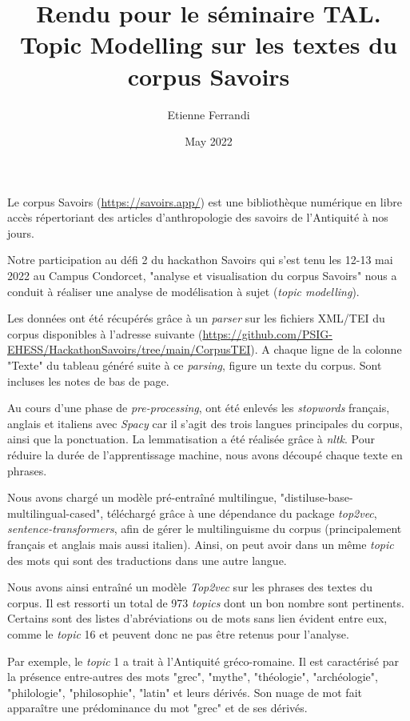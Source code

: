\documentclass{article}
\title{Rendu pour le séminaire TAL. Topic Modelling sur les textes du corpus Savoirs}
\author{Etienne Ferrandi}
\date{May 2022}
\begin{document}
\maketitle

Le corpus Savoirs (\url{https://savoirs.app/}) est une bibliothèque numérique en libre accès répertoriant des articles d'anthropologie des savoirs de l'Antiquité à nos jours. 

Notre participation au défi 2 du hackathon Savoirs qui s'est tenu les 12-13 mai 2022 au Campus Condorcet, "analyse et visualisation du corpus Savoirs" nous a conduit à réaliser une analyse de modélisation à sujet (\textit{topic modelling}). 

Les données ont été récupérés grâce à un \textit{parser} sur les fichiers XML/TEI du corpus disponibles à l'adresse suivante (\url{https://github.com/PSIG-EHESS/HackathonSavoirs/tree/main/CorpusTEI}). A chaque ligne de la colonne "Texte" du tableau généré suite à ce \textit{parsing}, figure un texte du corpus. Sont incluses les notes de bas de page.

Au cours d'une phase de \textit{pre-processing}, ont été enlevés les \textit{stopwords} français, anglais et italiens avec \textit{Spacy} car il s'agit des trois langues principales du corpus, ainsi que la ponctuation. La lemmatisation a été réalisée grâce à \textit{nltk}. Pour réduire la durée de l'apprentissage machine, nous avons découpé chaque texte en phrases. 

Nous avons chargé un modèle pré-entraîné multilingue, "distiluse-base-multilingual-cased", téléchargé grâce à une dépendance du package \textit{top2vec}, \textit{sentence-transformers}, afin de gérer le multilinguisme du corpus (principalement français et anglais mais aussi italien). Ainsi, on peut avoir dans un même \textit{topic} des mots qui sont des traductions dans une autre langue.

Nous avons ainsi entraîné un modèle \textit{Top2vec} sur les phrases des textes du corpus. Il est ressorti un total de 973 \textit{topics} dont un bon nombre sont pertinents. Certains sont des listes d'abréviations ou de mots sans lien évident entre eux, comme le \textit{topic} 16 et peuvent donc ne pas être retenus pour l'analyse.

Par exemple, le \textit{topic} 1 a trait à l'Antiquité gréco-romaine. Il est caractérisé par la présence entre-autres des mots "grec", "mythe", "théologie", "archéologie", "philologie", "philosophie", "latin" et leurs dérivés. Son nuage de mot fait apparaître une prédominance du mot "grec" et de ses dérivés.
\end{document}
